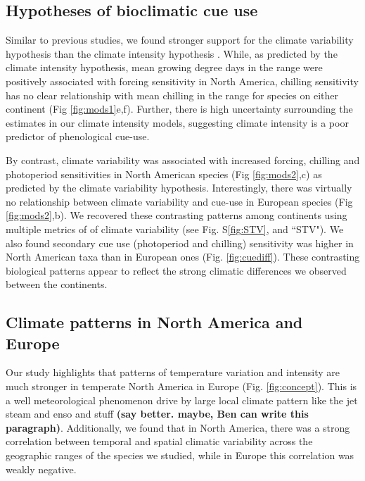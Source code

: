 \documentclass[12pt]{article}\usepackage[]{graphicx}\usepackage[]{color}
\begin{document}
\subsection*{Hypotheses of bioclimatic cue use}
Similar to previous studies, we found stronger support for the climate variability hypothesis than the climate intensity hypothesis \citep{Zohner:2017aa}. While, as predicted by the climate intensity hypothesis, mean growing degree days in the range were positively associated with forcing sensitivity in North America, chilling sensitivity has no clear relationship with mean chilling in the range for species on either continent (Fig \ref{fig:mods1}e,f).  Further, there is high uncertainty surrounding the estimates in our climate intensity models, suggesting climate intensity is a poor predictor of phenological cue-use.

\noindent By contrast, climate variability was associated with increased forcing, chilling and photoperiod sensitivities in North American species (Fig \ref{fig:mods2},c) as predicted by the climate variability hypothesis. Interestingly, there was virtually no relationship between climate variability and cue-use in European species (Fig \ref{fig:mods2},b). We recovered these contrasting patterns among continents using multiple metrics of of climate variability (see Fig. S\ref{fig:STV}, and ``STV"). We also found secondary cue use (photoperiod and chilling) sensitivity was higher in North American taxa than in European ones (Fig. \ref{fig:cuediff}). These contrasting biological patterns appear to reflect the strong climatic differences we observed between the continents.

\subsection*{Climate patterns in North America and Europe}
Our study highlights that patterns of temperature variation and intensity are much stronger in temperate North America in Europe (Fig. \ref{fig:concept}). This is a well meteorological phenomenon drive by large local climate pattern like the jet steam and enso and stuff \textbf{(say better. maybe, Ben can write this paragraph)}. Additionally, we found that in North America, there was a strong correlation between temporal and spatial climatic variability across the geographic ranges of the species we studied, while in Europe this correlation was weakly negative.
\end{document}
